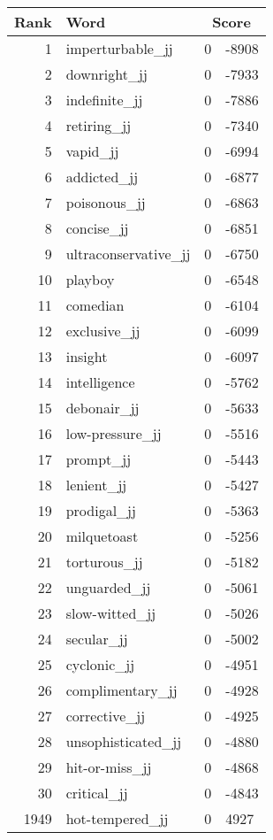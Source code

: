 \begin{longtable}[!htbp]{| rlr@{.}l |}
    \hline
    \textbf{Rank} & \textbf{Word} & \multicolumn{2}{c|}{\textbf{Score}} \\
    \hline
    \endhead
    1 & imperturbable\_jj & 0 & -8908 \\
    2 & downright\_jj & 0 & -7933 \\
    3 & indefinite\_jj & 0 & -7886 \\
    4 & retiring\_jj & 0 & -7340 \\
    5 & vapid\_jj & 0 & -6994 \\
    6 & addicted\_jj & 0 & -6877 \\
    7 & poisonous\_jj & 0 & -6863 \\
    8 & concise\_jj & 0 & -6851 \\
    9 & ultraconservative\_jj & 0 & -6750 \\
    10 & playboy & 0 & -6548 \\
    11 & comedian & 0 & -6104 \\
    12 & exclusive\_jj & 0 & -6099 \\
    13 & insight & 0 & -6097 \\
    14 & intelligence & 0 & -5762 \\
    15 & debonair\_jj & 0 & -5633 \\
    16 & low-pressure\_jj & 0 & -5516 \\
    17 & prompt\_jj & 0 & -5443 \\
    18 & lenient\_jj & 0 & -5427 \\
    19 & prodigal\_jj & 0 & -5363 \\
    20 & milquetoast & 0 & -5256 \\
    21 & torturous\_jj & 0 & -5182 \\
    22 & unguarded\_jj & 0 & -5061 \\
    23 & slow-witted\_jj & 0 & -5026 \\
    24 & secular\_jj & 0 & -5002 \\
    25 & cyclonic\_jj & 0 & -4951 \\
    26 & complimentary\_jj & 0 & -4928 \\
    27 & corrective\_jj & 0 & -4925 \\
    28 & unsophisticated\_jj & 0 & -4880 \\
    29 & hit-or-miss\_jj & 0 & -4868 \\
    30 & critical\_jj & 0 & -4843 \\
    1949 & hot-tempered\_jj & 0 & 4927 \\

\end{longtable}
